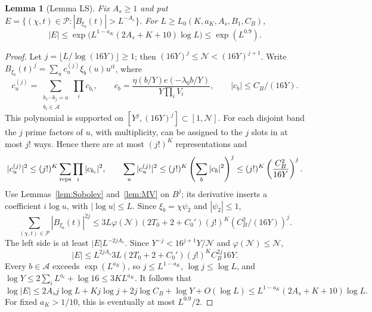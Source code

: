 \documentclass[11pt]{article}
\newtheorem{lemma}[theorem]{Lemma}
\theoremstyle{definition}
\newcommand{\ph}{\varphi}
\newcommand{\GN}{\mathcal N}
\newcommand{\Aset}{\mathcal A}
\theoremstyle{remark}
\numberwithin{equation}{section}
\begin{document}
\begin{lemma}[Lemma LS]\label{lem:LS}
Fix $A_s\ge1$ and put
$E=\{(\chi,t)\in\mathcal P:|B_{\xi_b}(t)|>L^{-A_s}\}$.
For $L\ge L_0(K,a_K,A_s,B_1,C_B)$,
\begin{equation}\label{eq:LS}
 |E|\le\exp\bigl(L^{1-a_K}(2A_s+K+10)\log L\bigr)
       \le\exp(L^{0.9}).
\end{equation}
\end{lemma}
\begin{proof}
Let $j=\lfloor L/\log(16Y)\rfloor\ge1$; then
$(16Y)^j\le\GN<(16Y)^{j+1}$.
Write $B_{\xi_b}(t)^j=\sum_uc_u^{(j)}\xi_b(u)u^{it}$, where
\begin{equation}\label{eq:B-power}
 c_u^{(j)}=\sum_{\substack{b_1\cdots b_j=u\\b_i\in\Aset}}
      \prod_i c_{b_i},\qquad
 c_b=\frac{\eta(b/Y)e(-\lambda_0b/Y)}{Y\prod_iV_i},\qquad
 |c_b|\le C_B/(16Y).
\end{equation}
This polynomial is supported on $[Y^j,(16Y)^j]\subset[1,\GN]$.
For each disjoint band the $j$ prime factors of $u$, with
multiplicity, can be assigned to the $j$ slots in at most $j!$ ways.
Hence there are at most $(j!)^K$ representations and
\begin{equation}\label{eq:B-power-norm}
 |c_u^{(j)}|^2\le(j!)^K\sum_{\rm reps}\prod_i|c_{b_i}|^2,
 \qquad
 \sum_u|c_u^{(j)}|^2
 \le(j!)^K\left(\sum_b|c_b|^2\right)^j
 \le(j!)^K\left(\frac{C_B^2}{16Y}\right)^j.
\end{equation}
Use Lemmas~\ref{lem:Sobolev} and~\ref{lem:MV} on $B^j$;
its derivative inserts a coefficient $i\log u$, with $|\log u|\le L$.
Since $\xi_b=\chi\psi_2$ and $|\psi_2|\le1$,
\begin{equation}\label{eq:B-moment}
 \sum_{(\chi,t)\in\mathcal P}|B_{\xi_b}(t)|^{2j}
 \le3L\ph(\GN)(2T_0+2+C_0')(j!)^K(C_B^2/(16Y))^j.
\end{equation}
The left side is at least $|E|L^{-2jA_s}$.
Since $Y^{-j}<16^{j+1}Y/\GN$ and $\ph(\GN)\le\GN$,
\begin{equation}\label{eq:E-count}
 |E|\le L^{2jA_s}3L(2T_0+2+C_0')(j!)^KC_B^{2j}16Y.
\end{equation}
Every $b\in\Aset$ exceeds $\exp(L^{a_K})$, so
$j\le L^{1-a_K}$, $\log j\le\log L$, and
$\log Y\le2\sum_iL^{a_i}+\log16\le3KL^{a_K}$.
It follows that
\[
 \log|E|\le2A_sj\log L+Kj\log j+2j\log C_B+\log Y+O(\log L)
 \le L^{1-a_K}(2A_s+K+10)\log L.
\]
For fixed $a_K>1/10$, this is eventually at most $L^{0.9}/2$.
\end{proof}
\end{document}
